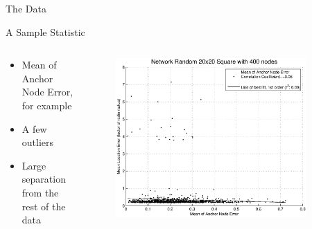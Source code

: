 \documentclass{beamer}
\begin{document}
\begin{frame}{The Data}
\begin{block}{A Sample Statistic}
\begin{columns}
	\begin{column}[T]{0.3\textwidth}
		\begin{itemize}
		\item Mean of Anchor Node Error, for example
		\item A few outliers
		\item Large separation from the rest of the data
		\end{itemize}
		\vfill
	\end{column}
	\begin{column}[T]{0.7\textwidth}
		\begin{figure}
		\centering
			\includegraphics[width=0.9\textwidth]{numneighbors/AnchorSetErrorVsError}
		\end{figure}
	\end{column}
\end{columns}
\end{block}
\end{frame}
\end{document}
